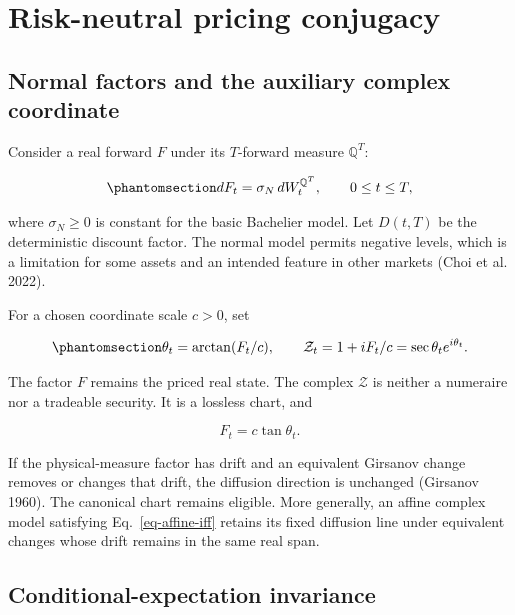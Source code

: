 \documentclass[
  english,
  10pt,
  letterpaper,
  DIV=11,
  numbers=noendperiod]{scrartcl}
\theoremstyle{definition}
\theoremstyle{plain}
\theoremstyle{plain}
\theoremstyle{remark}
\begin{document}
\section{Risk-neutral pricing conjugacy}\label{sec-finance}

\subsection{Normal factors and the auxiliary complex
coordinate}\label{normal-factors-and-the-auxiliary-complex-coordinate}

Consider a real forward \(F\) under its \(T\)-forward measure
\(\mathbb Q^T\):

\begin{equation}\protect\phantomsection\label{eq-normal-forward}{
dF_t=\sigma_N\,dW_t^{\mathbb Q^T},
\qquad 0\le t\le T,
}\end{equation}

where \(\sigma_N\ge0\) is constant for the basic Bachelier model. Let
\(D(t,T)\) be the deterministic discount factor. The normal model
permits negative levels, which is a limitation for some assets and an
intended feature in other markets (Choi et al. 2022).

For a chosen coordinate scale \(c>0\), set

\begin{equation}\protect\phantomsection\label{eq-financial-phase}{
\theta_t=\arctan(F_t/c),
\qquad
\mathcal Z_t=1+iF_t/c
=\sec\theta_t e^{i\theta_t}.
}\end{equation}

The factor \(F\) remains the priced real state. The complex
\(\mathcal Z\) is neither a numeraire nor a tradeable security. It is a
lossless chart, and

\[
F_t=c\tan\theta_t.
\]

If the physical-measure factor has drift and an equivalent Girsanov
change removes or changes that drift, the diffusion direction is
unchanged (Girsanov 1960). The canonical chart remains eligible. More
generally, an affine complex model satisfying Eq.~\ref{eq-affine-iff}
retains its fixed diffusion line under equivalent changes whose drift
remains in the same real span.

\subsection{Conditional-expectation
invariance}\label{conditional-expectation-invariance}
\end{document}
